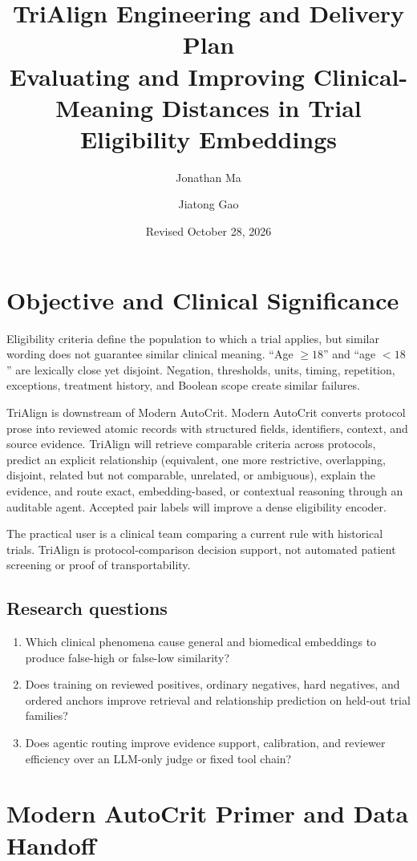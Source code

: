 \documentclass[10pt]{article}
\title{TriAlign Engineering and Delivery Plan\\\large Evaluating and Improving Clinical-Meaning Distances in Trial Eligibility Embeddings}
\author{Jonathan Ma \and Jiatong Gao}
\date{Revised October 28, 2026}
\begin{document}
\maketitle\tableofcontents

\section{Objective and Clinical Significance}
Eligibility criteria define the population to which a trial applies, but similar wording does not guarantee similar clinical meaning. ``Age $\geq18$'' and ``age $<18$'' are lexically close yet disjoint. Negation, thresholds, units, timing, repetition, exceptions, treatment history, and Boolean scope create similar failures.

TriAlign is downstream of Modern AutoCrit. Modern AutoCrit converts protocol prose into reviewed atomic records with structured fields, identifiers, context, and source evidence. TriAlign will retrieve comparable criteria across protocols, predict an explicit relationship (equivalent, one more restrictive, overlapping, disjoint, related but not comparable, unrelated, or ambiguous), explain the evidence, and route exact, embedding-based, or contextual reasoning through an auditable agent. Accepted pair labels will improve a dense eligibility encoder.

The practical user is a clinical team comparing a current rule with historical trials. TriAlign is protocol-comparison decision support, not automated patient screening or proof of transportability.

\subsection*{Research questions}
\begin{enumerate}
\item Which clinical phenomena cause general and biomedical embeddings to produce false-high or false-low similarity?
\item Does training on reviewed positives, ordinary negatives, hard negatives, and ordered anchors improve retrieval and relationship prediction on held-out trial families?
\item Does agentic routing improve evidence support, calibration, and reviewer efficiency over an LLM-only judge or fixed tool chain?
\end{enumerate}

\section{Modern AutoCrit Primer and Data Handoff}
\end{document}
